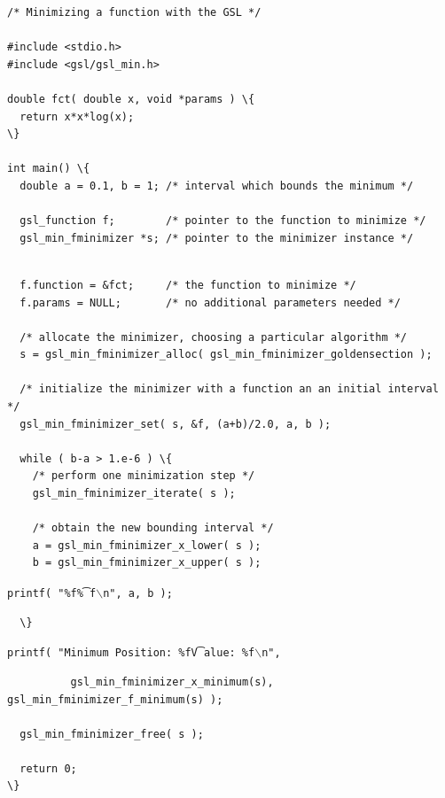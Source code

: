 \begin{verbatim}
/* Minimizing a function with the GSL */

#include <stdio.h>
#include <gsl/gsl_min.h>

double fct( double x, void *params ) \{ 
  return x*x*log(x);
\}

int main() \{
  double a = 0.1, b = 1; /* interval which bounds the minimum */

  gsl_function f;        /* pointer to the function to minimize */
  gsl_min_fminimizer *s; /* pointer to the minimizer instance */
\end{verbatim}
\begin{verbatim}

  f.function = &fct;     /* the function to minimize */
  f.params = NULL;       /* no additional parameters needed */

  /* allocate the minimizer, choosing a particular algorithm */
  s = gsl_min_fminimizer_alloc( gsl_min_fminimizer_goldensection );

  /* initialize the minimizer with a function an an initial interval */
  gsl_min_fminimizer_set( s, &f, (a+b)/2.0, a, b );

  while ( b-a > 1.e-6 ) \{
    /* perform one minimization step */
    gsl_min_fminimizer_iterate( s );

    /* obtain the new bounding interval */
    a = gsl_min_fminimizer_x_lower( s );
    b = gsl_min_fminimizer_x_upper( s );

\end{verbatim}\vspace*{-9pt}
\hspace*{34pt}\texttt{printf( "\%f\t\%f$\backslash$n", a, b );}\vspace*{-6pt}
\begin{verbatim}
  \} 

\end{verbatim}\vspace*{-9pt}
\hspace*{26pt}\texttt{printf( "Minimum Position: \%f\t Value: \%f$\backslash$n",}\vspace*{-6pt}
\begin{verbatim}
          gsl_min_fminimizer_x_minimum(s), gsl_min_fminimizer_f_minimum(s) );

  gsl_min_fminimizer_free( s );

  return 0;
\}
\end{verbatim}


\makeatletter
\def\texttt#1{{\fontsize{8.5}{10}\ttfamily\selectfont#1}}
\makeatother

